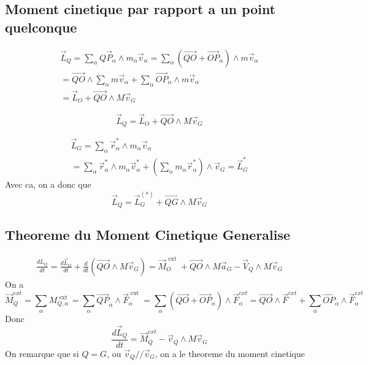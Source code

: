 \documentclass[../main.tex]{subfiles}
\begin{document}
\subsection{Moment cinetique par rapport a un point quelconque}
\begin{align*}
	\vec{L}_Q = \sum_{\alpha} Q \vec{P}_\alpha \land m_\alpha \vec{v}_\alpha = \sum_\alpha ( \vec{QO} + \vec{OP}_\alpha) \land m \vec{v}_\alpha\\
	= \vec{QO} \land \sum_\alpha m \vec{v}_\alpha + \sum_\alpha \vec{OP}_\alpha \land m \vec{v}_\alpha\\
	= \vec{L}_O + \vec{QO} \land M \vec{v}_G
\end{align*}
\begin{thm}
\[ 
\vec{L}_Q = \vec{L}_O + \vec{QO} \land M \vec{v}_G
\]

\end{thm}
\begin{align*}
\vec{L}_G = \sum_\alpha \vec{r}_\alpha ^{*} \land m_\alpha \vec{v}_\alpha\\
= \sum_{\alpha} \vec{r}_\alpha ^{*} \land m_\alpha \vec{v}_\alpha ^{*} + (  \sum_\alpha m_\alpha \vec{r}_\alpha ^{*}) \land \vec{v}_G = \vec{L}_G ^{*}
\end{align*}
Avec ca, on a donc que
\[ 
	\vec{L}_Q = \vec{L}_G ^{ ( *) } + \vec{QG} \land M \vec{v}_G
\]

\subsection{Theoreme du Moment Cinetique Generalise}
\begin{align*}
	\frac{d L_Q}{dt} = \frac{d \vec{L}_O}{dt} + \frac{d}{dt} ( \vec{QO} \land M \vec{v}_G)  = \vec{M}_O ^{ \text{ ext } } + \vec{QO} \land M \vec{a}_G - \vec{V}_Q \land M \vec{v}_G
\end{align*}
On a 
\[ 
	\vec{M}_Q ^{ext} = \sum_\alpha M_{Q,\alpha} ^{ \text{ ext } } = \sum_\alpha \vec{QP}_\alpha \land \vec{F}_\alpha ^{ \text{ ext } } = \sum_\alpha ( \vec{QO} + \vec{OP}_\alpha) \land \vec{F}_\alpha ^{ext} = \vec{QO} \land \vec{F}^{ext} + \sum_\alpha \vec{OP}_\alpha \land \vec{F}_\alpha ^{ext}
\]
Donc
\[ 
\frac{d \vec{L}_Q}{dt} = \vec{M}_Q ^{ext} - \vec{v}_Q \land M \vec{v}_G
\]
On remarque que si $Q=G$, ou $\vec{v}_Q // \vec{v}_G$, on a le theoreme du moment cinetique
\end{document}
